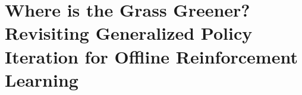 

\chapter[%
Revisiting GPI for
Offline RL]{%
Where is the Grass Greener? Revisiting Generalized Policy Iteration for
Offline Reinforcement Learning}
\label{thesis:chap3}



\clearpage
\begin{subappendices}

\end{subappendices}
